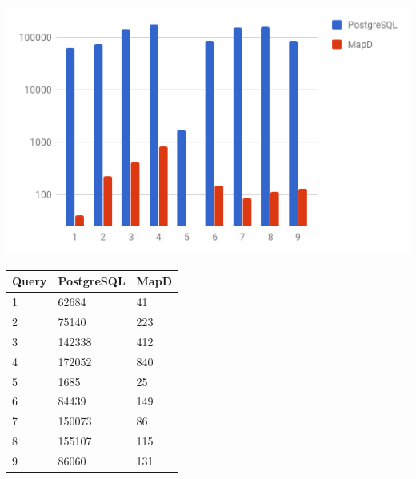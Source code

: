 \begin{minipage}{\textwidth}
  \begin{minipage}[b]{0.6\textwidth}
    \centering
     \includegraphics[width=1.0\textwidth,height=1.0\textheight,keepaspectratio]{images/warm_postgres_vs_mapd.png}
    \label{fig:warm_postgres_vs_mapd}
  \end{minipage}
  \hfill
  \begin{minipage}[b]{0.4\textwidth}
    \centering
  \begin{tabular}{ |l|l|l| }
    \hline
    Query & PostgreSQL & MapD \\
    \hline
    1 & 62684 & 41 \\
    2 & 75140 & 223 \\
    3 & 142338 & 412 \\
    4 & 172052 & 840 \\
    5 & 1685 & 25 \\
    6 & 84439 & 149 \\
    7 & 150073 & 86 \\
    8 & 155107 & 115 \\
    9 & 86060 & 131 \\
    \hline
\end{tabular}
            \label{tab:warm_postgres_vs_mapd}
    \end{minipage}
 \end{minipage}



